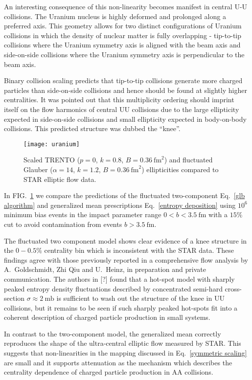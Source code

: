 \documentclass[aps,prl,reprint,amsmath,nofootinbib]{revtex4-1}
\begin{document}
An interesting consequence of this non-linearity becomes manifest in central U-U collisions. The Uranium
nucleus is highly deformed and prolonged along a preferred axis. This geometry allows for two distinct
configurations of Uranium collisions in which the density of nuclear matter is fully overlapping - tip-to-tip
collisions where the Uranium symmetry axis is aligned with the beam axis and side-on-side collisions where
the Uranium symmetry axis is perpendicular to the beam axis.

Binary collision scaling predicts that tip-to-tip collisions generate more charged particles than side-on-side
collisions and hence should be found at slightly higher centralities. It was pointed out that this
multiplicity ordering should imprint itself on the flow harmonics of central UU collisions due to the large
ellipticity expected in side-on-side collisions and small ellipticity expected in body-on-body collisions.
This predicted structure was dubbed the ``knee''.

\begin{figure}[t]
  \centering
  \texttt{[image: uranium]}
  \caption{\label{fig:knee}Scaled TRENTO ($p=0$, $k=0.8$, $B=0.36~\mathrm{fm}^2$) and fluctuated Glauber
  ($\alpha=14$, $k=1.2$, $B=0.36~\mathrm{fm}^2$) ellipticities compared to STAR elliptic flow data.}
\end{figure}

In FIG.~\ref{fig:knee} we compare the predictions of the fluctuated two-component Eq.~\eqref{glb algorithm}
and generalized mean prescriptions Eq.~\eqref{entropy deposition} using $10^6$ minimum bias events
in the impact parameter range $0<b<3.5 ~\mathrm{fm}$ with a $15\%$ cut to avoid contamination from events
$b>3.5 ~\mathrm{fm}$.

The fluctuated two component model shows clear evidence of a knee structure in the $0-0.5\%$ centrality bin
which is inconsistent with the STAR data. These findings agree with those previously reported in a
comprehensive flow analysis by A.\ Goldschmidt, Zhi Qiu and U.\ Heinz, in preparation and private communication.
The authors in [?] found that a hot-spot model with sharply peaked entropy density fluctuations described by
concentrated semi-hard cross-section $\sigma \approx 2 ~\mathrm{mb}$ is sufficient to wash out the structure
of the knee in UU collisions, but it remains to be seen if such sharply peaked hot-spots fit into a coherent
description of charged particle production in small systems.

In contrast to the two-component model, the generalized mean correctly reproduces the shape of the
ultra-central elliptic flow measured by STAR. This suggests that non-linearities in the mapping discussed in
Eq.~\eqref{symmetric scaling} are small and it supports attenuation as the mechanism which describes the
centrality dependence of charged particle production in AA collisions.
\end{document}
